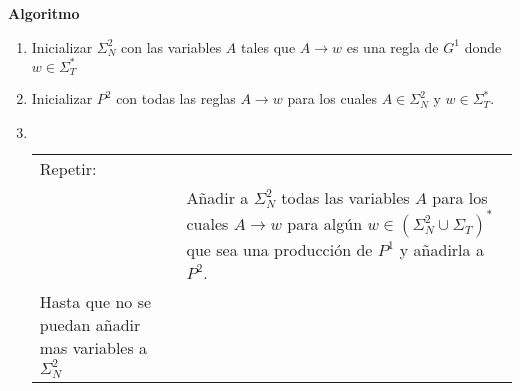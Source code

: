 \textbf{Algoritmo}
\begin{enumerate}
\item Inicializar $\Sigma_N^2$ con las variables $A$ tales que $A\rightarrow w$ es una regla de $G^1$ donde $w\in\Sigma_T^*$
\item Inicializar $P^2$ con todas las reglas $A\rightarrow w$ para los cuales $A\in \Sigma_N^2$ y $w\in\Sigma_T^*$.
\item $\;$\\
\begin{tabular}{p{4cm}p{8cm}}
Repetir:	&	\\
		&Añadir a $\Sigma_N^2$ todas las variables $A$ para los cuales $A\rightarrow w$ para algún $w\in(\Sigma_N^2\cup\Sigma_T)^*$ que sea una producción de $P^1$ y añadirla a $P^2$.	\\
Hasta que no se puedan añadir mas variables a $\Sigma_N^2$	&
\end{tabular}		
\end{enumerate}

